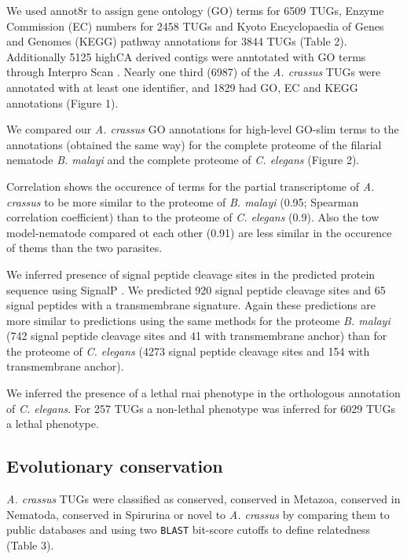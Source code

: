 \documentclass[10pt]{bmc_article}
\newenvironment{bmcformat}{\begin{raggedright}\baselineskip20pt\sloppy\setboolean{publ}{false}}{\end{raggedright}\baselineskip20pt\sloppy}
\begin{document}
\begin{bmcformat}
We used annot8r \cite{schmid_annot8r:_2008} to assign gene ontology
(GO) terms for 6509 TUGs, Enzyme Commission (EC) numbers for
2458 TUGs and Kyoto Encyclopaedia of Genes and Genomes (KEGG)
pathway annotations for 3844 TUGs (Table 2). Additionally
5125 highCA derived contigs were anntotated with GO terms
through Interpro Scan \cite{pmid11590104}. Nearly one third
(6987) of the \textit{A. crassus} TUGs were
annotated with at least one identifier, and 1829 had
GO, EC and KEGG annotations (Figure 1).

We compared our \textit{A. crassus} GO annotations for high-level
GO-slim terms to the annotations (obtained the same way) for the
complete proteome of the filarial nematode \textit{B. malayi} and the
complete proteome of \textit{C. elegans} (Figure 2).

Correlation shows the occurence of terms for the partial transcriptome
of \textit{A. crassus} to be more similar to the proteome of
\textit{B. malayi} (0.95; Spearman
correlation coefficient) than to the proteome of \textit{C. elegans}
(0.9). Also the tow model-nematode compared
ot each other (0.91) are less similar in the
occurence of thems than the two parasites.

We inferred presence of signal peptide cleavage sites in the predicted
protein sequence using SignalP \cite{pmid21959131}. We predicted
920 signal peptide cleavage sites and 65 signal
peptides with a transmembrane signature. Again these predictions are
more similar to predictions using the same methods for the proteome
\textit{B. malayi} (742 signal peptide cleavage sites and
41 with transmembrane anchor) than for the proteome of
\textit{C. elegans} (4273 signal peptide cleavage sites
and 154 with transmembrane anchor).

We inferred the presence of a lethal rnai phenotype in the orthologous
annotation of \textit{C. elegans}. For 257
TUGs a non-lethal phenotype was inferred for
6029 TUGs a lethal phenotype.

\subsection*{Evolutionary conservation}

\textit{A. crassus} TUGs were classified as conserved, conserved in
Metazoa, conserved in Nematoda, conserved in Spirurina or novel to
\textit{A. crassus} by comparing them to public databases and using
two \texttt{BLAST} bit-score cutoffs to define relatedness (Table 3).


\end{bmcformat}
\end{document}
